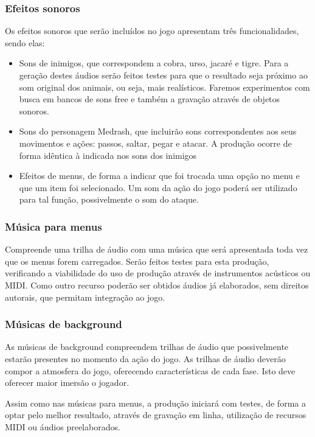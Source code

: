 \subsubsection{Efeitos sonoros}
Os efeitos sonoros que serão incluídos no jogo apresentam três funcionalidades, sendo elas:
\begin{itemize}
\item Sons de inimigos, que correspondem a cobra, urso, jacaré e tigre. 
Para a geração destes áudios serão feitos testes para que o resultado 
seja próximo ao som original dos animais, ou seja, mais realísticos. 
Faremos experimentos com busca em bancos de sons free e também a gravação através de objetos sonoros. 
\item Sons do personagem Medrash, que incluirão sons correspondentes aos seus movimentos e ações: passos, saltar, pegar e atacar. A produção ocorre de forma idêntica à indicada nos sons dos inimigos
\item Efeitos de menus, de forma a indicar que foi trocada uma opção no menu e que um item foi selecionado. Um som da ação do jogo poderá ser utilizado para tal função, possivelmente o som do ataque.
\end{itemize}

\subsubsection{Música para menus}
Compreende uma trilha de áudio com uma música que será apresentada toda vez que os menus forem carregados. Serão feitos testes para esta produção, verificando a viabilidade do uso de produção através de instrumentos acústicos ou MIDI. Como outro recurso poderão ser obtidos áudios já elaborados, sem direitos autorais, que permitam integração ao jogo.

\subsubsection{Músicas de background}
As músicas de background compreendem trilhas de áudio que possivelmente estarão presentes no momento da ação do jogo. As trilhas de áudio deverão compor a atmosfera do jogo, oferecendo características de cada fase. Isto deve oferecer maior imersão o jogador.

Assim como nas músicas para menus, a produção iniciará com testes, de forma a optar pelo melhor resultado, através de gravação em linha, utilização de recursos MIDI ou áudios preelaborados.

